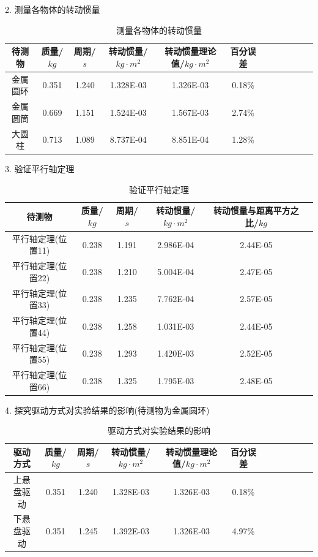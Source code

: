 \documentclass[12pt,hyperref,a4paper,UTF8]{ctexart}
\begin{document}
2. 测量各物体的转动惯量

\begin{table}[h!]
\centering
\begin{tabular}{|c|c|c|c|c|c|c|c|c|c|c|c|}
    \hline
    待测物 & 质量/$kg$ & 周期/$s$ & 转动惯量/$kg·m^2$ & 转动惯量理论值/$kg·m^2$ & 百分误差 \\
    \hline
      金属圆环 & 0.351 & 1.240 &  1.328E-03 & 1.326E-03 & 0.18\% \\
    \hline
      金属圆筒 & 0.669 & 1.151 &  1.524E-03 & 1.567E-03 & 2.74\% \\
    \hline
      大圆柱 & 0.713   & 1.089 &  8.737E-04 & 8.851E-04 & 1.28\% \\
    \hline
\end{tabular}
\caption{测量各物体的转动惯量}
\end{table}
    
3. 验证平行轴定理

\begin{table}[h!]
\centering

\begin{tabular}{|c|c|c|c|c|c|}
    \hline
    待测物 & 质量/$kg$ & 周期/$s$ & 转动惯量/$kg·m^2$ & 转动惯量与距离平方之比/$kg$ \\
    \hline
    平行轴定理(位置11) & 0.238 & 1.191 & 2.986E-04 & 2.44E-05 \\
    \hline
    平行轴定理(位置22) & 0.238 & 1.210 & 5.004E-04 & 2.47E-05 \\
    \hline
    平行轴定理(位置33) & 0.238 & 1.235 & 7.762E-04 & 2.57E-05 \\
    \hline
    平行轴定理(位置44) & 0.238 & 1.258 & 1.031E-03 & 2.44E-05 \\
    \hline
    平行轴定理(位置55) & 0.238 & 1.293 & 1.420E-03 & 2.52E-05 \\
    \hline
    平行轴定理(位置66) & 0.238 & 1.325 & 1.795E-03 & 2.48E-05 \\
    \hline
\end{tabular}
\caption{验证平行轴定理}
\end{table}

4. 探究驱动方式对实验结果的影响(待测物为金属圆环)

\begin{table}[h!]
\centering
\begin{tabular}{|c|c|c|c|c|c|c|c|c|c|c|c|}
      \hline
      驱动方式 & 质量/$kg$ & 周期/$s$ & 转动惯量/$kg·m^2$ & 转动惯量理论值/$kg·m^2$ & 百分误差 \\
      \hline
        上悬盘驱动 & 0.351 & 1.240 &  1.328E-03 & 1.326E-03 & 0.18\% \\
      \hline
        下悬盘驱动 & 0.351 & 1.245 &  1.392E-03 & 1.326E-03 & 4.97\% \\
      \hline
\end{tabular}
\caption{驱动方式对实验结果的影响}
\end{table}
\end{document}
